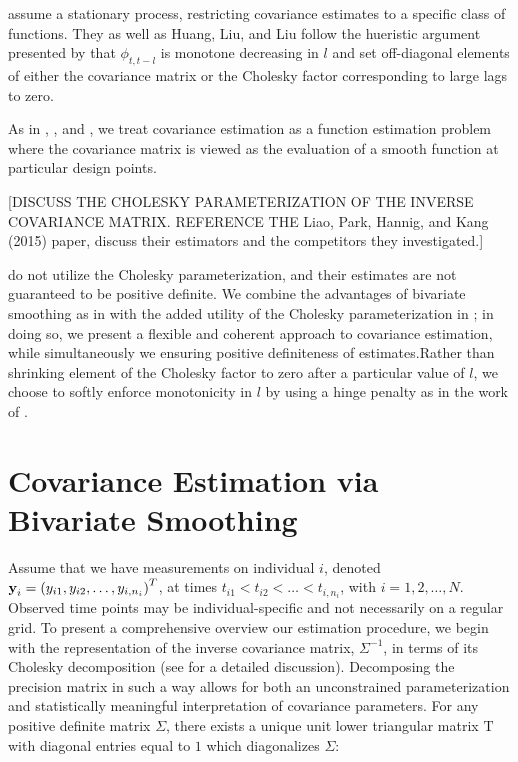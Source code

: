\documentclass[12pt]{article}
\newcommand*\needsparaphrased{\color{red}}
\newcommand{\bfy}{\mbox{\bf y}}
\newcommand{\matT}{\mbox{T}}
\begin{document}
\citet{kaufman2008covariance} assume a stationary process, restricting covariance estimates to a specific class of functions. They as well as  Huang, Liu, and Liu \cite{huang2007estimation} follow the hueristic argument presented by \cite{pourahmadi1999joint} that $\phi_{t,t-l}$ is monotone decreasing in $l$ and set off-diagonal elements of either the covariance matrix or the Cholesky factor corresponding to large lags to zero. 

As in \citet{huang2007estimation}, \citet{kaufman2008covariance}, and \citet{yao2005functional}, we treat covariance estimation as a function estimation problem where the covariance matrix is viewed as the evaluation of a smooth function at particular design points. 



{\needsparaphrased[DISCUSS THE CHOLESKY PARAMETERIZATION OF THE INVERSE COVARIANCE MATRIX. REFERENCE THE Liao, Park, Hannig, and Kang (2015) paper, discuss their estimators and the competitors they investigated.]}



\citet{yao2005functional} do not utilize the Cholesky parameterization, and their estimates are not guaranteed to be positive definite.  We combine the advantages of bivariate smoothing as in \citet{yao2005functional} with the added utility of the Cholesky parameterization in \citet{huang2007estimation}; in doing so, we present a flexible and coherent approach to covariance estimation, while simultaneously we ensuring positive definiteness of estimates.Rather than shrinking element of the Cholesky factor to zero after a particular value of $l$, we choose to softly enforce monotonicity in $l$ by using a hinge penalty as in the work of \citet{tibshirani2011nearly}. 

\section{Covariance Estimation via Bivariate Smoothing}

Assume that we have measurements on individual $i$, denoted $\bfy_i = \left( y_{i1}, y_{i2}, \dots, y_{i,n_i} \right)^T$, at times $t_{i1} < t_{i2} < \dots< t_{i,n_i}$, with $i=1,2,\dots,N$. Observed time points may be individual-specific and not necessarily on a regular grid. To present a comprehensive overview our estimation procedure, we begin with the representation of the inverse covariance matrix, $\Sigma^{-1}$, in terms of its Cholesky decomposition (see \citet{pourahmadi2007cholesky} for a detailed discussion). Decomposing the precision matrix in such a way allows for both an unconstrained parameterization and statistically meaningful interpretation of covariance parameters. For any positive definite matrix $\Sigma$, there exists a unique unit lower triangular matrix $\matT$ with diagonal entries equal to $1$ which diagonalizes $\Sigma$:
\end{document}
